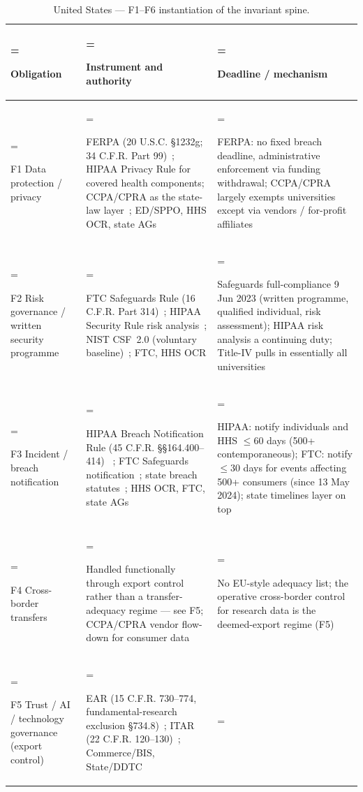\begin{table}[H]
\centering\small
\caption{United States --- F1--F6 instantiation of the invariant spine.}
\label{tab:reg-us}
\renewcommand{\arraystretch}{1.25}
\begin{tabularx}{\textwidth}{%
  >{\hsize=0.34\hsize\linewidth=\hsize\bfseries\raggedright\arraybackslash}X%
  >{\hsize=1.46\hsize\linewidth=\hsize\raggedright\arraybackslash}X%
  >{\hsize=1.20\hsize\linewidth=\hsize\raggedright\arraybackslash}X%
}
\toprule
Obligation & Instrument and authority & Deadline / mechanism \\
\midrule
F1 Data protection / privacy
  & FERPA (20 U.S.C. \S1232g; 34 C.F.R. Part 99)~\cite{us-ferpa};
    HIPAA Privacy Rule for covered health components; CCPA/CPRA as the
    state-law layer~\cite{us-ccpa-cpra}; ED/SPPO, HHS OCR, state AGs
  & FERPA: no fixed breach deadline, administrative enforcement via
    funding withdrawal; CCPA/CPRA largely exempts universities except
    via vendors / for-profit affiliates \\
F2 Risk governance / written security programme
  & FTC Safeguards Rule (16 C.F.R. Part 314)~\cite{us-ftc-safeguards};
    HIPAA Security Rule risk analysis~\cite{us-hipaa-security}; NIST
    CSF~2.0 (voluntary baseline)~\cite{nist-csf}; FTC, HHS OCR
  & Safeguards full-compliance 9 Jun 2023 (written programme,
    qualified individual, risk assessment); HIPAA risk analysis a
    continuing duty; Title-IV pulls in essentially all universities \\
F3 Incident / breach notification
  & HIPAA Breach Notification Rule (45 C.F.R. \S\S164.400--414)~%
    \cite{us-hipaa-breach}; FTC Safeguards
    notification~\cite{us-ftc-safeguards}; state breach
    statutes~\cite{us-ccpa-cpra}; HHS OCR, FTC, state AGs
  & HIPAA: notify individuals and HHS $\le$60 days (500+ contemporaneous);
    FTC: notify $\le$30 days for events affecting 500+ consumers
    (since 13 May 2024); state timelines layer on top \\
F4 Cross-border transfers
  & Handled functionally through export control rather than a
    transfer-adequacy regime --- see F5; CCPA/CPRA vendor flow-down for
    consumer data~\cite{us-ccpa-cpra}
  & No EU-style adequacy list; the operative cross-border control for
    research data is the deemed-export regime (F5) \\
F5 Trust / AI / technology governance (export control)
  & EAR (15 C.F.R. 730--774, fundamental-research exclusion
    \S734.8)~\cite{us-ear}; ITAR (22 C.F.R. 120--130)~\cite{us-itar};
    Commerce/BIS, State/DDTC

\end{tabularx}
\end{table}

